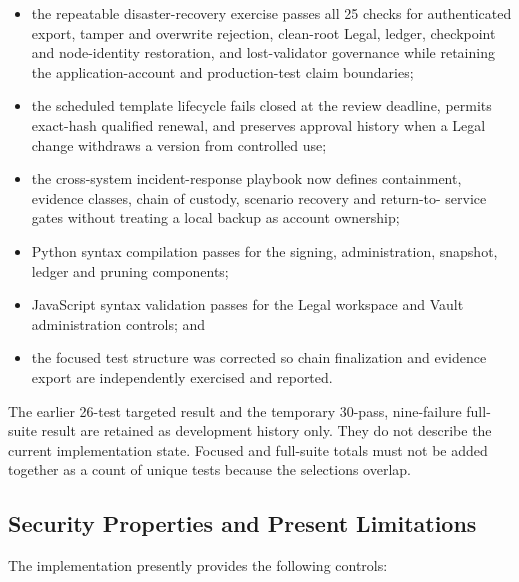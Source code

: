 \begin{itemize}
        validator and a joining replacement cannot contribute approval power,
        while unaffected current-validator quorum produces a portable verified
        transition proof that survives governance-store restart;
  \item the repeatable disaster-recovery exercise passes all 25 checks for
        authenticated export, tamper and overwrite rejection, clean-root Legal,
        ledger, checkpoint and node-identity restoration, and lost-validator
        governance while retaining the application-account and production-test
        claim boundaries;
  \item the scheduled template lifecycle fails closed at the review deadline,
        permits exact-hash qualified renewal, and preserves approval history
        when a Legal change withdraws a version from controlled use;
  \item the cross-system incident-response playbook now defines containment,
        evidence classes, chain of custody, scenario recovery and return-to-
        service gates without treating a local backup as account ownership;
  \item Python syntax compilation passes for the signing, administration,
        snapshot, ledger and pruning components;
  \item JavaScript syntax validation passes for the Legal workspace and Vault
        administration controls; and
  \item the focused test structure was corrected so chain finalization and
        evidence export are independently exercised and reported.
\end{itemize}

The earlier 26-test targeted result and the temporary 30-pass, nine-failure
full-suite result are retained as development history only.  They do not
describe the current implementation state.  Focused and full-suite totals must
not be added together as a count of unique tests because the selections overlap.

\subsection{Security Properties and Present Limitations}

The implementation presently provides the following controls:

